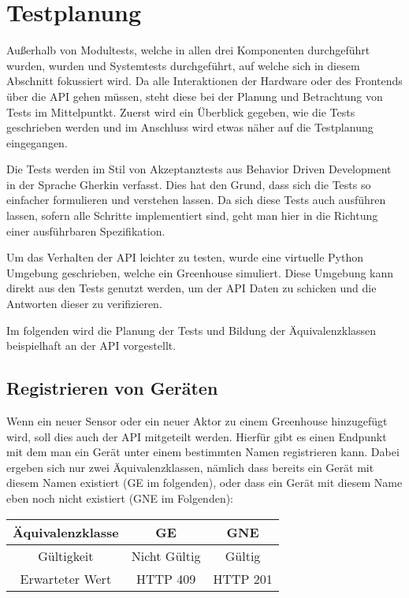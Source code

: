 \section{Testplanung}
Außerhalb von Modultests, welche in allen drei Komponenten durchgeführt wurden, wurden und Systemtests durchgeführt, auf welche sich in diesem Abschnitt fokussiert wird.
Da alle Interaktionen der Hardware oder des Frontends über die API gehen müssen, steht diese bei der Planung und Betrachtung von Tests im Mittelpuntkt.
Zuerst wird ein Überblick gegeben, wie die Tests geschrieben werden und im Anschluss wird etwas näher auf die Testplanung eingegangen.

Die Tests werden im Stil von Akzeptanztests aus Behavior Driven Development in der Sprache Gherkin verfasst.
Dies hat den Grund, dass sich die Tests so einfacher formulieren und verstehen lassen.
Da sich diese Tests auch ausführen lassen, sofern alle Schritte implementiert sind, geht man hier in die Richtung einer ausführbaren Spezifikation.

Um das Verhalten der API leichter zu testen, wurde eine virtuelle Python Umgebung geschrieben, welche ein Greenhouse simuliert.
Diese Umgebung kann direkt aus den Tests genutzt werden, um der API Daten zu schicken und die Antworten dieser zu verifizieren.

Im folgenden wird die Planung der Tests und Bildung der Äquivalenzklassen beispielhaft an der API vorgestellt.

\subsection{Registrieren von Geräten}
Wenn ein neuer Sensor oder ein neuer Aktor zu einem Greenhouse hinzugefügt wird, soll dies auch der API mitgeteilt werden.
Hierfür gibt es einen Endpunkt mit dem man ein Gerät unter einem bestimmten Namen registrieren kann.
Dabei ergeben sich nur zwei Äquivalenzklassen, nämlich dass bereits ein Gerät mit diesem Namen existiert (GE im folgenden), oder dass ein Gerät mit diesem Name eben noch nicht existiert (GNE im Folgenden):

\begin{center}
\small
\begin{tabular}{|c||c|c|}
\hline
Äquivalenzklasse&GE&GNE \\
\hline
Gültigkeit&Nicht Gültig&Gültig \\
\hline
Erwarteter Wert&HTTP 409&HTTP 201 \\
\hline
\end{tabular}
\end{center}

